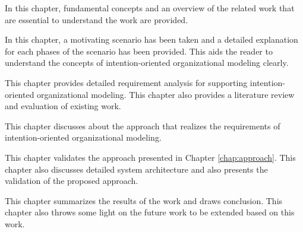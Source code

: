 \begin{description} [labelwidth = 0.07\textwidth]
	\item[Chapter ~\ref{chap:fundamentals} -- \nameref{chap:fundamentals}:] In this chapter, fundamental concepts and an overview of the related work that are essential to understand the work are provided.
	\item[Chapter ~\ref{chap:motivatingScenario} -- \nameref{chap:motivatingScenario}:] In this chapter, a motivating scenario has been taken and a detailed explanation for each phases of the scenario has been provided. This aids the reader to understand the concepts of intention-oriented organizational modeling clearly. 
	\item [Chapter ~\ref{chap:analysis} -- \nameref{chap:analysis}:] This chapter provides detailed requirement analysis for supporting intention-oriented organizational modeling. This chapter also provides a literature review and evaluation of existing work.
	\item[Chapter ~\ref{chap:approach} -- \nameref{chap:approach}:] This chapter discusses about the approach that realizes the requirements  of intention-oriented organizational modeling.
	\item[Chapter ~\ref{chap:casestudy} -- \nameref{chap:casestudy}:] This chapter validates the approach presented in Chapter \ref{chap:approach}. This chapter also discusses detailed system architecture and also presents the validation of the proposed approach. 	
	\item[Chapter ~\ref{chap:conclusion} -- \nameref{chap:conclusion}:] This chapter summarizes the results of the work and draws conclusion. This chapter also throws some light on the future work to be extended based on this work. 
\end{description}
